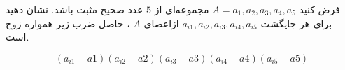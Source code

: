\EXERCISE
فرض کنيد 
$A = {a_1, a_2, a_3, a_4, a_5}$
 مجموعه‌ای از 
$5$
  عدد صحيح مثبت باشد. نشان دهيد برای هر جايگشت
$a_{i1}, a_{i2}, a_{i3}, a_{i4}, a_{i5}$
  ازاعضای 
$A$
  ، حاصل ضرب زير همواره زوج است.
  
$$(a_{i1}-a1)(a_{i2}-a2)(a_{i3}-a3)(a_{i4}-a4)(a_{i5}-a5)$$